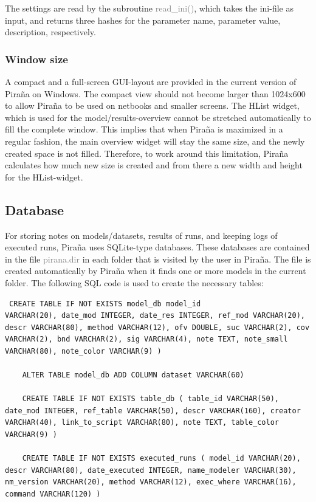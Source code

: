 \documentclass[a4,11pt]{report}
\begin{document}
The settings are read by the subroutine \textcolor{Grey}{read\_ini()},
which takes the ini-file as input, and returns three hashes for the
parameter name, parameter value, description, respectively.

\subsubsection{Window size} A compact and a full-screen GUI-layout are
provided in the current version of Pira\~na on Windows. The compact
view should not become larger than 1024x600 to allow Pira\~na to be
used on netbooks and smaller screens. The HList widget, which is used
for the model/results-overview cannot be stretched automatically to
fill the complete window. This implies that when Pira\~na is maximized
in a regular fashion, the main overview widget will stay the same
size, and the newly created space is not filled. Therefore, to work
around this limitation, Pira\~na calculates how much new size is
created and from there a new width and height for the HList-widget.

\subsection{Database} For storing notes on models/datasets, results of
runs, and keeping logs of executed runs, Pira\~na uses SQLite-type
databases. These databases are contained in the file
\textcolor{Grey}{pirana.dir} in each folder that is visited by the
user in Pira\~na. The file is created automatically by Pira\~na when
it finds one or more models in the current folder. The following SQL
code is used to create the necessary tables:

\footnotesize
\begin{verbatim} CREATE TABLE IF NOT EXISTS model_db model_id
VARCHAR(20), date_mod INTEGER, date_res INTEGER, ref_mod VARCHAR(20),
descr VARCHAR(80), method VARCHAR(12), ofv DOUBLE, suc VARCHAR(2), cov
VARCHAR(2), bnd VARCHAR(2), sig VARCHAR(4), note TEXT, note_small
VARCHAR(80), note_color VARCHAR(9) )

    ALTER TABLE model_db ADD COLUMN dataset VARCHAR(60)

    CREATE TABLE IF NOT EXISTS table_db ( table_id VARCHAR(50),
date_mod INTEGER, ref_table VARCHAR(50), descr VARCHAR(160), creator
VARCHAR(40), link_to_script VARCHAR(80), note TEXT, table_color
VARCHAR(9) )

    CREATE TABLE IF NOT EXISTS executed_runs ( model_id VARCHAR(20),
descr VARCHAR(80), date_executed INTEGER, name_modeler VARCHAR(30),
nm_version VARCHAR(20), method VARCHAR(12), exec_where VARCHAR(16),
command VARCHAR(120) )
\end{verbatim} \normalsize
\end{document}
